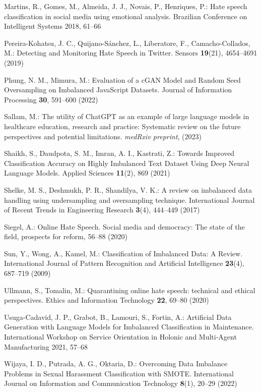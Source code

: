 \documentclass[runningheads]{llncs}
\begin{document}
\begin{thebibliography}{31}
Martins, R., Gomes, M., Almeida, J. J., Novais, P., Henriques, P.: Hate speech classification in social media using emotional analysis. Brazilian Conference on Intelligent Systems 2018, 61--66

Pereira-Kohatsu, J. C., Quijano-Sánchez, L., Liberatore, F., Camacho-Collados, M.: Detecting and Monitoring Hate Speech in Twitter. Sensors \textbf{19}(21), 4654--4691 (2019)

Phung, N. M., Mimura, M.: Evaluation of a cGAN Model and Random Seed Oversampling on Imbalanced JavaScript Datasets. Journal of Information Processing \textbf{30}, 591--600 (2022)

Sallam, M.: The utility of ChatGPT as an example of large language models in healthcare education, research and practice: Systematic review on the future perspectives and potential limitations. \emph{medRxiv preprint}, (2023)

Shaikh, S., Daudpota, S. M., Imran, A. I., Kastrati, Z.: Towards Improved Classification Accuracy on Highly Imbalanced Text Dataset Using Deep Neural Language Models. Applied Sciences \textbf{11}(2), 869 (2021)

Shelke, M. S., Deshmukh, P. R., Shandilya, V. K.: A review on imbalanced data handling using undersampling and oversampling technique. International Journal of Recent Trends in Engineering Research \textbf{3}(4), 444--449 (2017)

Siegel, A.: Online Hate Speech. Social media and democracy: The state of the field, prospects for reform, 56--88 (2020)

Sun, Y., Wong, A., Kamel, M.: Classification of Imbalanced Data: A Review. International Journal of Pattern Recognition and Artificial Intelligence \textbf{23}(4), 687--719 (2009)

Ullmann, S., Tomalin, M.: Quarantining online hate speech: technical and ethical perspectives. Ethics and Information Technology \textbf{22}, 69--80 (2020)

Usuga-Cadavid, J. P., Grabot, B., Lamouri, S., Fortin, A.: Artificial Data Generation with Language Models for Imbalanced Classification in Maintenance. International Workshop on Service Orientation in Holonic and Multi-Agent Manufacturing 2021, 57--68

Wijaya, I. D., Putrada, A. G., Oktaria, D.: Overcoming Data Imbalance Problems in Sexual Harassment Classification with SMOTE. International Journal on Information and Communication Technology \textbf{8}(1), 20--29 (2022)

\end{thebibliography}
\end{document}
